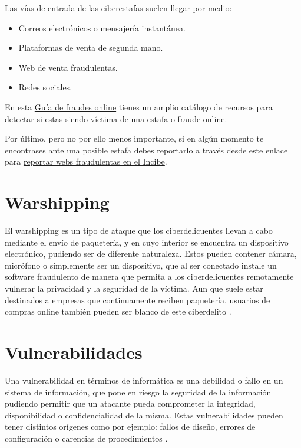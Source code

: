 \documentclass[
  a4paper,
  openany]{book}
\begin{document}
Las vías de entrada de las ciberestafas suelen llegar por medio:

\begin{itemize}
\item
  Correos electrónicos o mensajería instantánea.
\item
  Plataformas de venta de segunda mano.
\item
  Web de venta fraudulentas.
\item
  Redes sociales.
\end{itemize}

En esta \href{https://www.osi.es/es/guia-fraudes-online}{Guía de fraudes online} tienes un amplio catálogo de recursos para detectar si estas siendo víctima de una estafa o fraude online.

Por último, pero no por ello menos importante, si en algún momento te encontrases ante una posible estafa debes reportarlo a través desde este enlace para \href{https://www.incibe.es/protege-tu-empresa/reporte-fraude}{reportar webs fraudulentas en el Incibe}.

\hypertarget{warshipping}{%
\section{Warshipping}\label{warshipping}}

El warshipping es un tipo de ataque que los ciberdelicuentes llevan a cabo mediante el envío de paquetería, y en cuyo interior se encuentra un dispositivo electrónico, pudiendo ser de diferente naturaleza. Estos pueden contener cámara, micrófono o simplemente ser un dispositivo, que al ser conectado instale un software fraudulento de manera que permita a los ciberdelicuentes remotamente vulnerar la privacidad y la seguridad de la víctima. Aun que suele estar destinados a empresas que continuamente reciben paquetería, usuarios de compras online también pueden ser blanco de este ciberdelito \citep{INCI-warshipping}.

\hypertarget{vulnerabilidades}{%
\section{Vulnerabilidades}\label{vulnerabilidades}}

Una vulnerabilidad en términos de informática es una debilidad o fallo en un sistema de información, que pone en riesgo la seguridad de la información pudiendo permitir que un atacante pueda comprometer la integridad, disponibilidad o confidencialidad de la misma. Estas vulnerabilidades pueden tener distintos orígenes como por ejemplo: fallos de diseño, errores de configuración o carencias de procedimientos \citep{INCI-vulnerabilidad}.
\end{document}
